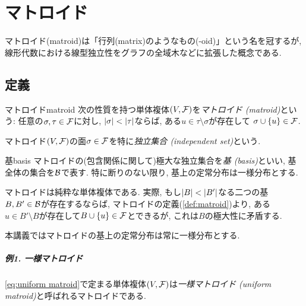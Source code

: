 \chapter{マトロイド} \label{chap:matroid}
マトロイド(matroid)は「行列(matrix)のようなもの(-oid)」という名を冠するが,
線形代数における線型独立性をグラフの全域木などに拡張した概念である.

\section{定義}
\begin{definition}{マトロイド}{matroid}
    次の性質を持つ単体複体$(V,\mathcal{F})$を\emph{マトロイド (matroid)}という:
    任意の$\sigma,\tau \in \mathcal{F}$に対し, $\lvert\sigma\rvert < \lvert\tau\rvert$ならば,
    ある$ u \in \tau \setminus \sigma$が存在して
    $\sigma \cup \lbrace u\rbrace \in \mathcal{F}$.

    マトロイド$(V,\mathcal{F})$の面$\sigma\in \mathcal{F}$を特に\emph{独立集合 (independent set)}という.
\end{definition}

\begin{definition}{基}{basis}
    マトロイドの(包含関係に関して)極大な独立集合を\emph{基 (basis)}といい, 基全体の集合を$\mathcal{B}$で表す.
    特に断りのない限り, 基上の定常分布は一様分布とする.
\end{definition}
マトロイドは純粋な単体複体である.
実際, もし$\lvert B\rvert < \lvert B'\rvert$なる二つの基$B,B'\in\mathcal{B}$が存在するならば,
マトロイドの定義(\cref{def:matroid})より,
ある$u \in B'\setminus B$が存在して$B\cup \{u\} \in \mathcal{F}$とできるが,
これは$B$の極大性に矛盾する.

本講義ではマトロイドの基上の定常分布は常に一様分布とする.

\paragraph*{例1. 一様マトロイド}
\cref{eq:uniform matroid}で定まる単体複体$(V,\mathcal{F})$は\emph{一様マトロイド (uniform matroid)}と呼ばれるマトロイドである.

